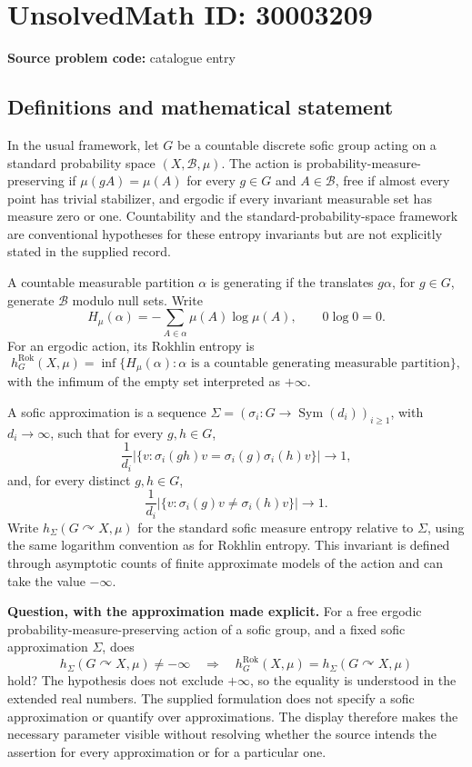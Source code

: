 \documentclass[11pt]{article}
\begin{document}
\section*{UnsolvedMath ID: 30003209}
\textbf{Source problem code:} catalogue entry
\subsection{Definitions and mathematical statement}
In the usual framework, let \(G\) be a countable discrete sofic group acting on a standard probability space \((X,\mathcal B,\mu)\). The action is probability-measure-preserving if \(\mu(gA)=\mu(A)\) for every \(g\in G\) and \(A\in\mathcal B\), free if almost every point has trivial stabilizer, and ergodic if every invariant measurable set has measure zero or one. Countability and the standard-probability-space framework are conventional hypotheses for these entropy invariants but are not explicitly stated in the supplied record.

A countable measurable partition \(\alpha\) is generating if the translates \(g\alpha\), for \(g\in G\), generate \(\mathcal B\) modulo null sets. Write
\[
H_\mu(\alpha)=-\sum_{A\in\alpha}\mu(A)\log\mu(A),
\qquad 0\log 0=0.
\]
For an ergodic action, its Rokhlin entropy is
\[
h_G^{\mathrm{Rok}}(X,\mu)
=\inf\{H_\mu(\alpha):\alpha\text{ is a countable generating measurable partition}\},
\]
with the infimum of the empty set interpreted as \(+\infty\).

A sofic approximation is a sequence \(\Sigma=(\sigma_i:G\to\operatorname{Sym}(d_i))_{i\geq1}\), with \(d_i\to\infty\), such that for every \(g,h\in G\),
\[
\frac{1}{d_i}\bigl|\{v:\sigma_i(gh)v=\sigma_i(g)\sigma_i(h)v\}\bigr|\longrightarrow1,
\]
and, for every distinct \(g,h\in G\),
\[
\frac{1}{d_i}\bigl|\{v:\sigma_i(g)v\ne\sigma_i(h)v\}\bigr|\longrightarrow1.
\]
Write \(h_\Sigma(G\curvearrowright X,\mu)\) for the standard sofic measure entropy relative to \(\Sigma\), using the same logarithm convention as for Rokhlin entropy. This invariant is defined through asymptotic counts of finite approximate models of the action and can take the value \(-\infty\).

\textbf{Question, with the approximation made explicit.} For a free ergodic probability-measure-preserving action of a sofic group, and a fixed sofic approximation \(\Sigma\), does
\[
h_\Sigma(G\curvearrowright X,\mu)\ne-\infty
\quad\Longrightarrow\quad
h_G^{\mathrm{Rok}}(X,\mu)=h_\Sigma(G\curvearrowright X,\mu)
\]
hold? The hypothesis does not exclude \(+\infty\), so the equality is understood in the extended real numbers. The supplied formulation does not specify a sofic approximation or quantify over approximations. The display therefore makes the necessary parameter visible without resolving whether the source intends the assertion for every approximation or for a particular one.
\end{document}
